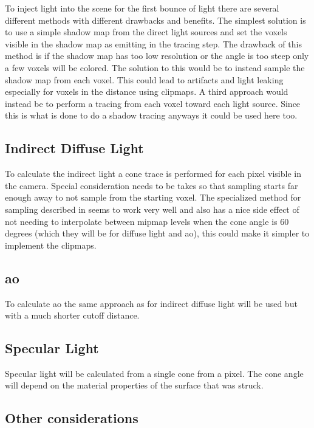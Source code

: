 \documentclass[a4paper, 12pt]{article}
\begin{document}
To inject light into the scene for the first bounce of light there are several different methods with different drawbacks and benefits. The simplest solution is to use a simple shadow map from the direct light sources and set the voxels visible in the shadow map as emitting in the tracing step. The drawback of this method is if the shadow map has too low resolution or the angle is too steep only a few voxels will be colored. The solution to this would be to instead sample the shadow map from each voxel. This could lead to artifacts and light leaking especially for voxels in the distance using clipmaps. A third approach would instead be to perform a tracing from each voxel toward each light source. Since this is what is done to do a shadow tracing anyways it could be used here too.

\subsection{Indirect Diffuse Light}

To calculate the indirect light a cone trace is performed for each pixel visible in the camera. Special consideration needs to be takes so that sampling starts far enough away to not sample from the starting voxel. The specialized method for sampling described in \cite{phdthesis} seems to work very well and also has a nice side effect of not needing to interpolate between mipmap levels when the cone angle is 60 degrees (which they will be for diffuse light and \gls{ao}), this could make it simpler to implement the clipmaps.

\subsection{\acrlong{ao}}

To calculate \gls{ao} the same approach as for indirect diffuse light will be used but with a much shorter cutoff distance.

\subsection{Specular Light}

Specular light will be calculated from a single cone from a pixel. The cone angle will depend on the material properties of the surface that was struck.

\subsection{Other considerations}
\end{document}
